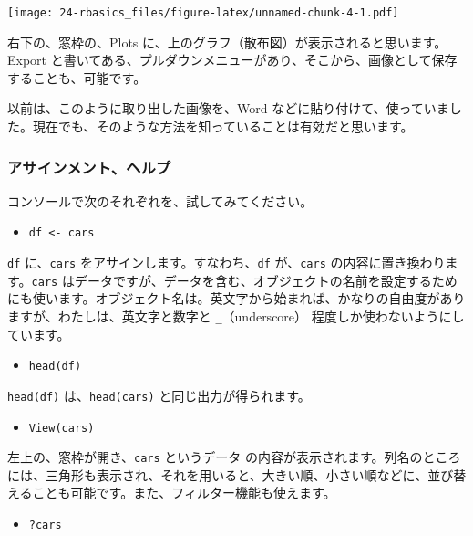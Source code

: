 \documentclass[
]{bxjsbook}
\providecommand{\tightlist}{%
  \setlength{\itemsep}{0pt}\setlength{\parskip}{0pt}}
\theoremstyle{definition}
\theoremstyle{definition}
\theoremstyle{definition}
\theoremstyle{definition}
\theoremstyle{remark}
\begin{document}
\texttt{[image: 24-rbasics\_files/figure-latex/unnamed-chunk-4-1.pdf]}

右下の、窓枠の、Plots に、上のグラフ（散布図）が表示されると思います。Export と書いてある、プルダウンメニューがあり、そこから、画像として保存することも、可能です。

以前は、このように取り出した画像を、Word などに貼り付けて、使っていました。現在でも、そのような方法を知っていることは有効だと思います。

\hypertarget{ux30a2ux30b5ux30a4ux30f3ux30e1ux30f3ux30c8ux30d8ux30ebux30d7}{%
\subsubsection{アサインメント、ヘルプ}\label{ux30a2ux30b5ux30a4ux30f3ux30e1ux30f3ux30c8ux30d8ux30ebux30d7}}

コンソールで次のそれぞれを、試してみてください。

\begin{itemize}
\tightlist
\item
  \texttt{df\ \textless{}-\ cars}
\end{itemize}

\texttt{df} に、\texttt{cars} をアサインします。すなわち、\texttt{df} が、\texttt{cars} の内容に置き換わります。\texttt{cars} はデータですが、データを含む、オブジェクトの名前を設定するためにも使います。オブジェクト名は。英文字から始まれば、かなりの自由度がありますが、わたしは、英文字と数字と \texttt{\_}（underscore） 程度しか使わないようにしています。

\begin{itemize}
\tightlist
\item
  \texttt{head(df)}
\end{itemize}

\texttt{head(df)} は、\texttt{head(cars)} と同じ出力が得られます。

\begin{itemize}
\tightlist
\item
  \texttt{View(cars)}
\end{itemize}

左上の、窓枠が開き、\texttt{cars} というデータ の内容が表示されます。列名のところには、三角形も表示され、それを用いると、大きい順、小さい順などに、並び替えることも可能です。また、フィルター機能も使えます。

\begin{itemize}
\tightlist
\item
  \texttt{?cars}
\end{itemize}
\end{document}
